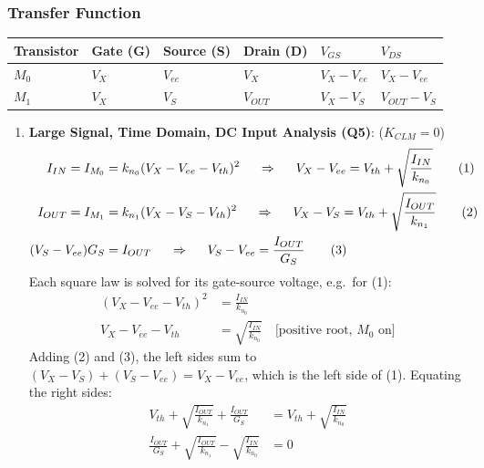 \subsubsection{Transfer Function}
\noindent\begin{tabularx}{\linewidth}{|X|X|X|X|X|X|} \hline
  Transistor & Gate (G) & Source (S) & Drain (D) & $V_{GS}$ & $V_{DS}$ \\ \hline
  $M_0$ & $V_{X}$ & $V_{ee}$ & $V_{X}$ & $V_{X} - V_{ee}$ & $V_{X} - V_{ee}$ \\ \hline
  $M_1$ & $V_{X}$ & $V_{S}$ & $V_{OUT}$ & $V_{X} - V_{S}$ & $V_{OUT} - V_{S}$ \\ \hline
\end{tabularx}
\begin{enumerate}
  \item \textbf{Large Signal, Time Domain, DC Input Analysis (Q5)}: (\(K_{CLM} = 0\))
    \begin{align*}
      I_{IN} = I_{M_0} &= k_{n_0}(V_X - V_{ee} - V_{th})^2
        \hspace{0.5cm} \Rightarrow \hspace{0.5cm} V_X - V_{ee} = V_{th} + \sqrt{\frac{I_{IN}}{k_{n_0}}} \tag{1} \\
      I_{OUT} = I_{M_1} &= k_{n_1}(V_X - V_S - V_{th})^2
        \hspace{0.5cm} \Rightarrow \hspace{0.5cm} V_X - V_S = V_{th} + \sqrt{\frac{I_{OUT}}{k_{n_1}}} \tag{2} \\
      (V_S - V_{ee}) G_S &= I_{OUT}
        \hspace{0.5cm} \Rightarrow \hspace{0.5cm} V_S - V_{ee} = \frac{I_{OUT}}{G_S} \tag{3}
    \end{align*}
    Each square law is solved for its gate-source voltage, e.g.\ for (1):
    \begin{align*}
      (V_X - V_{ee} - V_{th})^2 &= \frac{I_{IN}}{k_{n_0}} \\
      V_X - V_{ee} - V_{th} &= \sqrt{\frac{I_{IN}}{k_{n_0}}} \quad \text{[positive root, } M_0 \text{ on]}
    \end{align*}
    Adding (2) and (3), the left sides sum to \((V_X - V_S) + (V_S - V_{ee}) = V_X - V_{ee}\),
    which is the left side of (1). Equating the right sides:
    \begin{align*}
      V_{th} + \sqrt{\frac{I_{OUT}}{k_{n_1}}} + \frac{I_{OUT}}{G_S} &= V_{th} + \sqrt{\frac{I_{IN}}{k_{n_0}}} \\
      \frac{I_{OUT}}{G_S} + \sqrt{\frac{I_{OUT}}{k_{n_1}}} - \sqrt{\frac{I_{IN}}{k_{n_0}}} &= 0 \tag{4}

\end{align*}
\end{enumerate}
